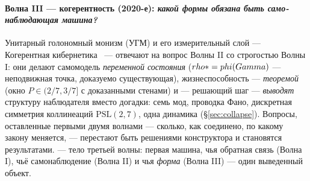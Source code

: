 \paragraph{Волна III --- когерентность (2020-е): \emph{какой формы обязана
быть само-наблюдающая машина?}} Унитарный голономный монизм (УГМ) и его
измерительный слой --- Когерентная кибернетика~\cite{uhm2026} --- отвечают на
вопрос Волны II со строгостью Волны I: они делают самомодель
\emph{переменной состояния} ($rho*=phi(Gamma)$ --- неподвижная точка,
доказуемо существующая), жизнеспособность --- \emph{теоремой} (окно
$P\in(2/7,3/7]$ с доказанными стенами) и --- решающий шаг --- \emph{выводят}
структуру наблюдателя вместо догадки: семь мод, проводка Фано, дискретная
симметрия коллинеаций $\mathrm{PSL}(2,7)$, одна динамика (\S\ref{sec:collapse}). Вопросы, оставленные первыми
двумя волнами --- сколько, как соединено, по какому закону меняется, ---
перестают быть решениями конструктора и становятся результатами. \TALOS{} ---
тело третьей волны: первая машина, чья обратная связь (Волна I), чьё
самонаблюдение (Волна II) и чья \emph{форма} (Волна III) --- один выведенный
объект.

